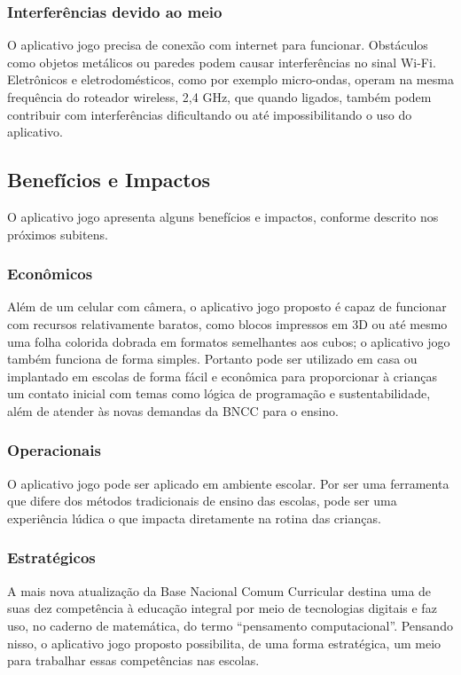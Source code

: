         \subsubsection{Interferências devido ao meio}
        O aplicativo jogo precisa de conexão com internet para funcionar. Obstáculos como objetos metálicos ou paredes podem causar interferências no sinal Wi-Fi. Eletrônicos e eletrodomésticos, como por exemplo micro-ondas, operam na mesma frequência do roteador wireless, 2,4 GHz, que quando ligados, também podem contribuir com interferências dificultando ou até impossibilitando o uso do aplicativo.
    
    \subsection{Benefícios e Impactos}
    O aplicativo jogo apresenta alguns benefícios e impactos, conforme descrito nos próximos subitens.

        \subsubsection{Econômicos}
        Além de um celular com câmera, o aplicativo jogo proposto é capaz de funcionar com recursos relativamente baratos, como blocos impressos em 3D ou até mesmo uma folha colorida dobrada em formatos semelhantes aos cubos; o aplicativo jogo também funciona de forma simples. Portanto pode ser utilizado em casa ou implantado em escolas de forma fácil e econômica para proporcionar à crianças um contato inicial com temas como lógica de programação e sustentabilidade, além de atender às novas demandas da BNCC para o ensino.
        
        \subsubsection{Operacionais}
        O aplicativo jogo pode ser aplicado em ambiente escolar. Por ser uma ferramenta que difere dos métodos tradicionais de ensino das escolas, pode ser uma experiência lúdica o que impacta diretamente na rotina das crianças.
        
        \subsubsection{Estratégicos}
        A mais nova atualização da Base Nacional Comum Curricular destina uma de suas dez competência à educação integral por meio de tecnologias digitais e faz uso, no caderno de matemática, do termo “pensamento computacional”. Pensando nisso, o aplicativo jogo proposto possibilita, de uma forma estratégica, um meio para trabalhar essas competências nas escolas. 
        

